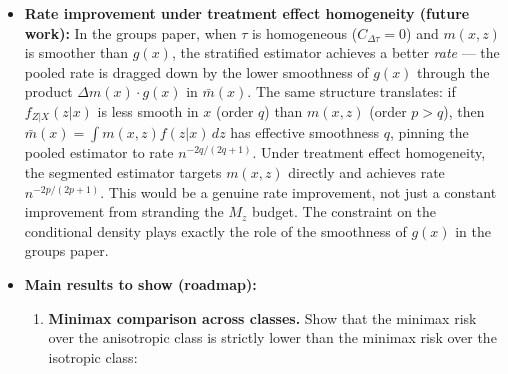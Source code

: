 \begin{itemize}
	The standard RDHonest approach places a single bound $M_P$ on the derivative of the pooled regression function $\bar{m}(x)$.
	This is analogous to the isotropic class: $\abs{\bar{m}'(x)} \leq M_P$ bounds the whole derivative jointly, without distinguishing between the smoothing component ($\partial m / \partial x$) and the compositional component (from $\partial f_{Z|X} / \partial x$).
	The anisotropic class achieves separation via the triangle inequality:
	\begin{equation*}
		\abs{\bar{m}'(x)} = \abs*{\int \frac{\partial m}{\partial x}(x,z) f(z|x)\, dz + \int m(x,z) \frac{\partial f}{\partial x}(z|x)\, dz} \leq M_x + \text{(compositional term)}.
	\end{equation*}
	This decomposition is the continuous analog of $M_P = M_L + C_{\Delta m} L$ in the groups paper.
	In both cases, the single pooled bound is fungible --- the adversary can concentrate curvature in whichever channel maximizes bias.
	The separated parameterization (anisotropic class / common parameter space) prevents this reallocation, which is the right way to set up the problem for studying covariate adjustment in RDDs.
	\item \textbf{Rate improvement under treatment effect homogeneity (future work):}
	In the groups paper, when $\tau$ is homogeneous ($C_{\Delta\tau} = 0$) and $m(x,z)$ is smoother than $g(x)$, the stratified estimator achieves a better \emph{rate} --- the pooled rate is dragged down by the lower smoothness of $g(x)$ through the product $\Delta m(x) \cdot g(x)$ in $\bar{m}(x)$.
	The same structure translates: if $f_{Z|X}(z|x)$ is less smooth in $x$ (order $q$) than $m(x,z)$ (order $p > q$), then $\bar{m}(x) = \int m(x,z) f(z|x)\, dz$ has effective smoothness $q$, pinning the pooled estimator to rate $n^{-2q/(2q+1)}$.
	Under treatment effect homogeneity, the segmented estimator targets $m(x,z)$ directly and achieves rate $n^{-2p/(2p+1)}$.
	This would be a genuine rate improvement, not just a constant improvement from stranding the $M_z$ budget.
	The constraint on the conditional density plays exactly the role of the smoothness of $g(x)$ in the groups paper.
	\item \textbf{Main results to show (roadmap):}
	\begin{enumerate}
		\item \textbf{Minimax comparison across classes.}
		Show that the minimax risk over the anisotropic class is strictly lower than the minimax risk over the isotropic class:
		\begin{equation*}

\end{equation*}
\end{enumerate}
\end{itemize}
